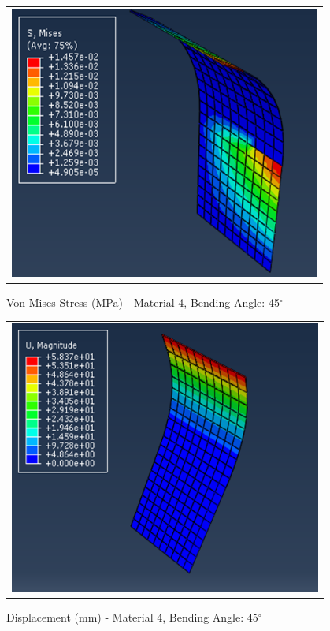 \documentclass[a4paper,12pt]{article}
\numberwithin{equation}{section}
\numberwithin{figure}{section}
\begin{document}
\begin{figure}[H]
  \centering
  \begin{tabular}{@{}c@{}}
    \includegraphics[width=0.7\linewidth,height=255pt]{Results/Bending/M4_VMS_45.png} \\
  \end{tabular}
  \caption{Von Mises Stress (MPa) - Material 4,  Bending Angle: 45$^{\circ}$ }
\end{figure}

\begin{figure}[H]
  \centering
  \begin{tabular}{@{}c@{}}
    \includegraphics[width=0.7\linewidth,height=255pt]{Results/Bending/M4_DIS_45.png} \\
  \end{tabular}
  \caption{Displacement (mm) - Material 4, Bending Angle: 45$^{\circ}$ }
\end{figure}
\end{document}
